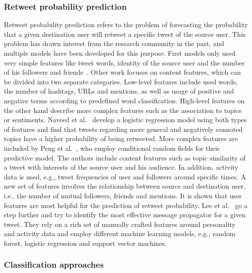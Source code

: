 \subsubsection{Retweet probability prediction}

Retweet probability prediction refers to the problem of forecasting the
probability that a given destination user will retweet a specific tweet of
the source user.
This problem has drawn interest from the research community in the past, and
multiple models have been developed for this purpose.
First models only used very simple features like tweet words, identity of the
source user and the number of his followers and friends~\cite{Zaman2010}.
Other work focuses on content features, which can be divided into two separate
categories.
Low-level features include used words, the number of hashtags, URLs and mentions,
as well as usage of positive and negative terms according to predefined word 
classification.
High-level features on the other hand describe more complex features such as
the association to topics or sentiments.
Naveed et al.~\cite{Naveed2011} develop a logistic regression model using
both types of features and find that tweets regarding more general and 
negatively connoted topics have a higher probability of being retweeted.
More complex features are included by Peng et al.~\cite{Peng2011},
who employ conditional random fields for their predictive model.
The authors include content features such as topic similarity of a tweet with 
interests of the source user and his audience.
In addition, activity data is used, e.g., tweet frequencies of user and
followers around specific times.
A new set of features involves the relationship between source and destination
user, i.e., the number of mutual followers, friends and mentions.
It is shown that user features are most helpful for the prediction of
retweet probability.
Lee et al.~\cite{Lee2014} go a step further and try to identify the most
effective message propagator for a given tweet.
They rely on a rich set of manually crafted features around personality and activity data
and employ different machine learning models, e.g., random forest, logistic
regression and support vector machines.

\subsubsection{Classification approaches}

